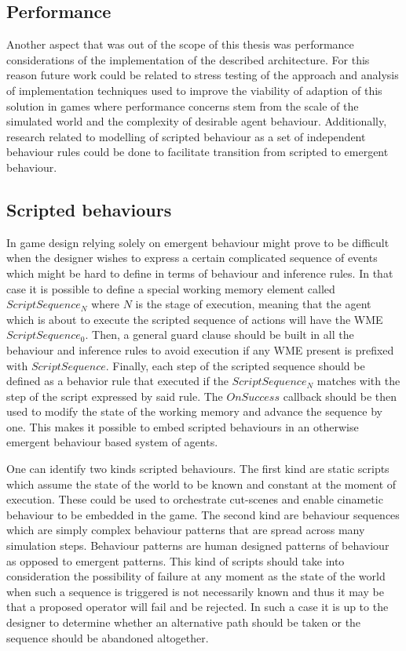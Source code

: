 \subsection{Performance}

Another aspect that was out of the scope of this thesis was performance considerations of the implementation of the described architecture.
For this reason future work could be related to stress testing of the approach and analysis of implementation techniques used to improve the viability of adaption of this solution in games where performance concerns stem from the scale of the simulated world and the complexity of desirable agent behaviour.
Additionally, research related to modelling of scripted behaviour as a set of independent behaviour rules could be done to facilitate transition from scripted to emergent behaviour.

\subsection{Scripted behaviours}

In game design relying solely on emergent behaviour might prove to be difficult when the designer wishes to express a certain complicated sequence of events which might be hard to define in terms of behaviour and inference rules.
In that case it is possible to define a special working memory element called $ScriptSequence_N$ where $N$ is the stage of execution, meaning that the agent which is about to execute the scripted sequence of actions will have the WME $ScriptSequence_0$.
Then, a general guard clause should be built in all the behaviour and inference rules to avoid execution if any WME present is prefixed with $ScriptSequence$.
Finally, each step of the scripted sequence should be defined as a behavior rule that executed if the $ScriptSequence_N$ matches with the step of the script expressed by said rule.
The $OnSuccess$ callback should be then used to modify the state of the working memory and advance the sequence by one.
This makes it possible to embed scripted behaviours in an otherwise emergent behaviour based system of agents.

One can identify two kinds scripted behaviours.
The first kind are static scripts which assume the state of the world to be known and constant at the moment of execution.
These could be used to orchestrate cut-scenes and enable cinametic behaviour to be embedded in the game.
The second kind are behaviour sequences which are simply complex behaviour patterns that are spread across many simulation steps.
Behaviour patterns are human designed patterns of behaviour as opposed to emergent patterns.
This kind of scripts should take into consideration the possibility of failure at any moment as the state of the world when such a sequence is triggered is not necessarily known and thus it may be that a proposed operator will fail and be rejected.
In such a case it is up to the designer to determine whether an alternative path should be taken or the sequence should be abandoned altogether.

